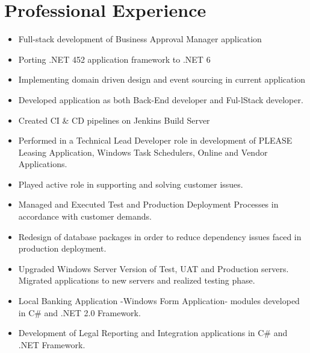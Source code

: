 \documentclass[1pt,a4paper,verdana]{moderncv} %
\begin{document}
\section{Professional Experience}
	{\begin{itemize}
		\item Full-stack development of Business Approval Manager application
		\item Porting .NET 452 application framework to .NET 6
		\item Implementing domain driven design and event sourcing in current application
\end{itemize}}
	{\begin{itemize}
			\item Developed application as both Back-End developer and Ful-lStack developer. 
			\item Created CI \& CD pipelines on  Jenkins Build Server
\end{itemize}}
	{
		\begin{itemize}
		\item Performed in a Technical Lead Developer role in development of PLEASE Leasing Application, Windows Task Schedulers, Online and Vendor Applications.
		\item Played active role in supporting and solving customer issues.
		\item Managed and Executed Test and Production Deployment Processes in accordance with customer demands.
		\item Redesign of database packages in order to reduce dependency issues faced in production deployment.		
		\item Upgraded Windows Server Version of Test, UAT and Production servers. Migrated applications to new servers and realized testing phase.
\end{itemize}}		
	{
		\begin{itemize}
		\item Local Banking Application -Windows Form Application- modules developed in C\# and .NET 2.0 Framework. 
		\item Development of Legal Reporting and Integration applications in C\# and .NET Framework.
\end{itemize}}
\end{document}
